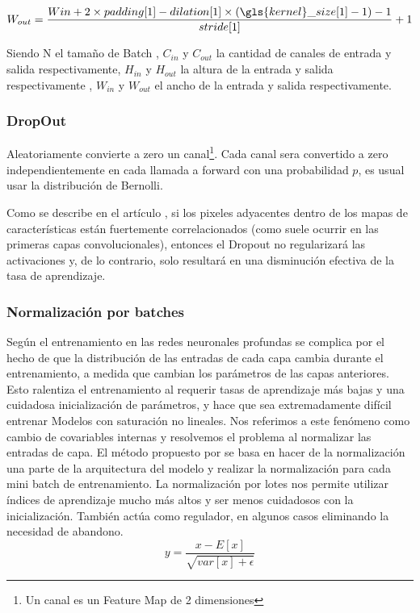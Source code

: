         \begin{equation}
            W_{out} = \frac{W{in}+2\times padding[1]-dilation[1]  \times (\gls{kernel}\_size[1]-1)-1}{stride[1]} +1
        \end{equation}
        
    Siendo N el tamaño de \gls{Batch} , $C_{in}$ y $C_{out}$ la cantidad de canales de entrada y salida respectivamente, $H_{in}$ y $H_{out}$ la altura de la entrada y salida respectivamente , $W_{in}$ y $W_{out}$ el ancho de la entrada y salida respectivamente.



    
\subsubsection{DropOut}

Aleatoriamente convierte a zero un canal\footnote{ Un canal es un \gls{Feature Map} de 2 dimensiones}. Cada canal sera convertido a zero independientemente en cada llamada a forward con una probabilidad $p$, es usual usar la distribución de Bernolli. 

Como se describe en el artículo \cite{Tompson2014}, si los pixeles adyacentes dentro de los mapas de características están fuertemente correlacionados (como suele ocurrir en las primeras capas convolucionales), entonces el Dropout no regularizará las activaciones y, de lo contrario, solo resultará en una disminución efectiva de la tasa de aprendizaje.


\subsubsection{Normalización por batches}
 Según \cite{Ioffe2015} el entrenamiento en las redes neuronales profundas se complica por el hecho de que la distribución de las entradas de cada capa cambia durante el entrenamiento, a medida que cambian los parámetros de las capas anteriores. Esto ralentiza el entrenamiento al requerir tasas de aprendizaje más bajas y una cuidadosa inicialización de parámetros, y hace que sea extremadamente difícil entrenar Modelos con saturación no lineales. Nos referimos a este fenómeno como cambio de covariables internas y resolvemos el problema al normalizar las entradas de capa. El método propuesto por \cite{Ioffe2015} se basa en hacer de la normalización una parte de la arquitectura del modelo y realizar la normalización para cada mini batch de entrenamiento. La normalización por lotes nos permite utilizar índices de aprendizaje mucho más altos y ser menos cuidadosos con la inicialización. También actúa como regulador, en algunos casos eliminando la necesidad de abandono. 
 \begin{equation}
     y = \frac{x-E[x]}{\sqrt{var[x]+\epsilon}}
 \end{equation}

